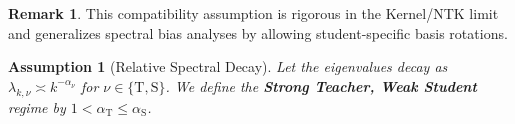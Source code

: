 \documentclass{article}
\theoremstyle{definition}
\newtheorem{definition}{Definition}
\theoremstyle{definition}
\newtheorem{remark}{Remark}
\theoremstyle{plain}
\theoremstyle{plain}
\newtheorem{assumption}{Assumption}
\theoremstyle{plain}
\theoremstyle{plain}
\theoremstyle{plain}
\newcommand{\te}{\mathrm{T}}
\newcommand{\st}{\mathrm{S}}
\begin{document}

\begin{remark}
This compatibility assumption is rigorous in the Kernel/NTK limit \citep{jacot2018neural} and generalizes spectral bias analyses \citep{bordelon2020spectrum} by allowing student-specific basis rotations.
\end{remark}

\begin{assumption}[Relative Spectral Decay]
\label{assump:spectral_decay}
Let the eigenvalues decay as $\lambda_  {k, \nu} \asymp k^{-\alpha_\nu}$ for $\nu \in \{\te, \st\}$. We define the \textbf{Strong Teacher, Weak Student} regime by $1 < \alpha_\te \leq \alpha_\st$.
\end{assumption}
\end{document}
